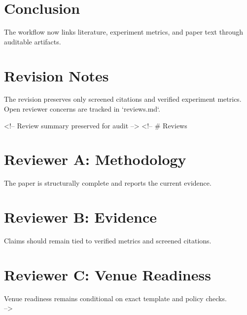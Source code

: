 \documentclass{article}
\begin{document}
\section{Conclusion}
The workflow now links literature, experiment metrics, and paper text through auditable artifacts.

\section{Revision Notes}
The revision preserves only screened citations and verified experiment metrics. Open reviewer concerns are tracked in `reviews.md`.

<!-- Review summary preserved for audit -->
<!-- \# Reviews

\section{Reviewer A: Methodology}
\noindent The paper is structurally complete and reports the current evidence.\\
\section{Reviewer B: Evidence}
\noindent Claims should remain tied to verified metrics and screened citations.\\
\section{Reviewer C: Venue Readiness}
\noindent Venue readiness remains conditional on exact template and policy checks.\\
 -->
\end{document}
